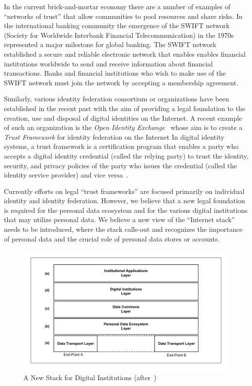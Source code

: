 In the current brick-and-mortar economy there are a number of examples
of ``networks of trust'' that allow communities to pool resources and share risks.
In the international banking community the emergence
of the SWIFT network~\cite{SWIFTnetwork} 
(Society for Worldwide Interbank Financial Telecommunication) 
in the 1970s represented a major milestone for global banking.
The SWIFT network established a secure and reliable electronic network
that enables enables financial institutions worldwide 
to send and receive information about financial transactions.
Banks and financial institutions who wish to make use of the SWIFT network
must join the network by accepting a membership agreement.

Similarly, various identity federation consortium or organizations
have been established in the recent past with the aim of providing
a legal foundation to the creation, use and disposal of digital identities
on the Internet.
A recent example of such an organization is
the {\em Open Identity Exchange}~\cite{OIX-website}
whose aim is to create a {\em  Trust Framework} for identity federation
on the Internet
In digital identity systems, a trust framework
is a certification program that enables a party
who accepts a digital identity credential
(called the relying party) to trust the identity,
security, and privacy policies of the party
who issues the credential (called the identity
service provider) and vice versa~\cite{OIX-website}.

Currently efforts on legal ``trust frameworks''
are focused primarily on individual identity and identity federation.
However, we believe that a new legal foundation is
required for the personal data ecosystem and for
the various digital institutions that may utilize
personal data.
We believe a new view of the ``Internet stack''
needs to be introduced, where the stack
calls-out and recognizes the importance of personal data
and the crucial role of personal data stores or accounts.



\begin{figure}[!t]
\centering
\includegraphics[width=7in]{figure-new-stack}
\caption{A New Stack for Digital Institutions (after~\cite{HardjonoDeegan2014})}
\label{fig:newstack}
\end{figure}



